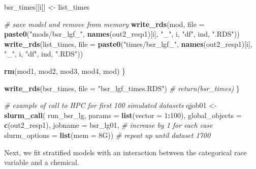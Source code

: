 \documentclass[12pt, twoside]{amherstthesis}
\newenvironment{Shaded}{\begin{snugshade}}{\end{snugshade}}
\newcommand{\AttributeTok}[1]{\textcolor[rgb]{0.13,0.29,0.53}{#1}}
\newcommand{\CommentTok}[1]{\textcolor[rgb]{0.56,0.35,0.01}{\textit{#1}}}
\newcommand{\DecValTok}[1]{\textcolor[rgb]{0.00,0.00,0.81}{#1}}
\newcommand{\FunctionTok}[1]{\textcolor[rgb]{0.13,0.29,0.53}{\textbf{#1}}}
\newcommand{\NormalTok}[1]{#1}
\newcommand{\OtherTok}[1]{\textcolor[rgb]{0.56,0.35,0.01}{#1}}
\newcommand{\SpecialCharTok}[1]{\textcolor[rgb]{0.81,0.36,0.00}{\textbf{#1}}}
\newcommand{\StringTok}[1]{\textcolor[rgb]{0.31,0.60,0.02}{#1}}
\begin{document}
\begin{Shaded}
\begin{Highlighting}[]
\NormalTok{    bsr\_times[[i]] }\OtherTok{\textless{}{-}}\NormalTok{ list\_times}
    
    \CommentTok{\# save model and remove from memory}
    \FunctionTok{write\_rds}\NormalTok{(mod, }\AttributeTok{file =} 
                \FunctionTok{paste0}\NormalTok{(}\StringTok{"mods/bsr\_lgf\_"}\NormalTok{, }\FunctionTok{names}\NormalTok{(out2\_resp1)[i], }\StringTok{"\_"}\NormalTok{, i, }
                       \StringTok{"df"}\NormalTok{, ind, }\StringTok{".RDS"}\NormalTok{))}
    \FunctionTok{write\_rds}\NormalTok{(list\_times, }\AttributeTok{file =} 
                \FunctionTok{paste0}\NormalTok{(}\StringTok{"times/bsr\_lgf\_"}\NormalTok{, }\FunctionTok{names}\NormalTok{(out2\_resp1)[i], }\StringTok{"\_"}\NormalTok{, i, }
                       \StringTok{"df"}\NormalTok{, ind, }\StringTok{".RDS"}\NormalTok{))}
    
    \FunctionTok{rm}\NormalTok{(mod1, mod2, mod3, mod4, mod)}
\NormalTok{  \}}
  
  \FunctionTok{write\_rds}\NormalTok{(bsr\_times, }\AttributeTok{file =} \StringTok{"bsr\_lgf\_times.RDS"}\NormalTok{)}
  \CommentTok{\# return(bsr\_times)}
\NormalTok{\}}

\CommentTok{\# example of call to HPC for first 100 simulated datasets}
\NormalTok{qjob01 }\OtherTok{\textless{}{-}} \FunctionTok{slurm\_call}\NormalTok{(}
\NormalTok{  run\_bsr\_lg, }\AttributeTok{params =} \FunctionTok{list}\NormalTok{(}\AttributeTok{vector =} \DecValTok{1}\SpecialCharTok{:}\DecValTok{100}\NormalTok{),}
  \AttributeTok{global\_objects =} \FunctionTok{c}\NormalTok{(}\StringTok{\textquotesingle{}out2\_resp1\textquotesingle{}}\NormalTok{),}
  \AttributeTok{jobname =} \StringTok{\textquotesingle{}bsr\_lg01\textquotesingle{}}\NormalTok{, }\CommentTok{\# increase by 1 for each case}
  \AttributeTok{slurm\_options =} \FunctionTok{list}\NormalTok{(}\AttributeTok{mem =} \StringTok{\textquotesingle{}8G\textquotesingle{}}\NormalTok{))}
  \CommentTok{\# repeat up until dataset 1700}
\end{Highlighting}
\end{Shaded}
\normalsize

Next, we fit stratified models with an interaction between the categorical race variable and a chemical.
\end{document}
